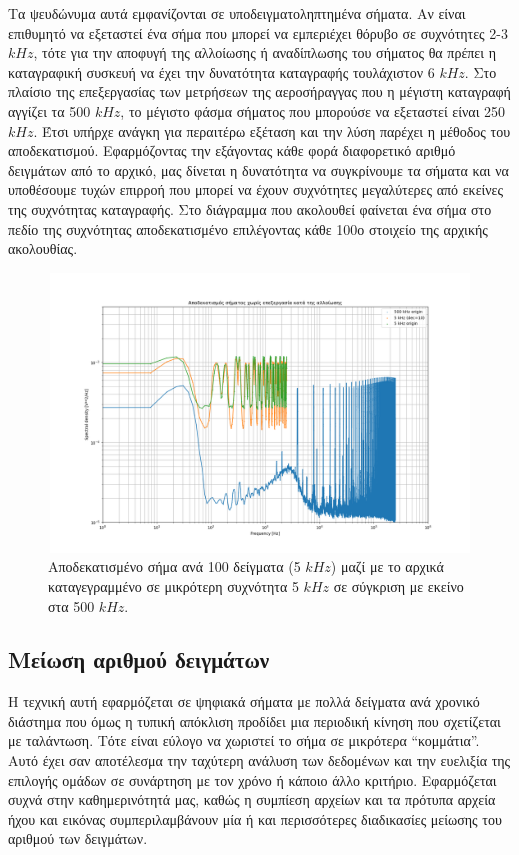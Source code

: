 \documentclass[breaklines=true, 12pt]{article}
\begin{document}
Τα ψευδώνυμα αυτά εμφανίζονται σε υποδειγματοληπτημένα σήματα. Αν είναι επιθυμητό
να εξεταστεί ένα σήμα που μπορεί να εμπεριέχει θόρυβο σε συχνότητες 2-3 \(kHz\), τότε για
την αποφυγή της αλλοίωσης ή αναδίπλωσης του σήματος θα πρέπει η καταγραφική συσκευή
να έχει την δυνατότητα καταγραφής τουλάχιστον 6 \(kHz\). Στο πλαίσιο της επεξεργασίας των
μετρήσεων της αεροσήραγγας που η μέγιστη καταγραφή αγγίζει τα 500 \(kHz\), το μέγιστο
φάσμα σήματος που μπορούσε να εξεταστεί είναι 250 \(kHz\). Έτσι υπήρχε ανάγκη για
περαιτέρω εξέταση και την λύση παρέχει η μέθοδος του αποδεκατισμού. Εφαρμόζοντας την
εξάγοντας κάθε φορά διαφορετικό αριθμό δειγμάτων από το αρχικό, μας δίνεται η
δυνατότητα να συγκρίνουμε τα σήματα και να υποθέσουμε τυχών επιρροή που μπορεί να
έχουν συχνότητες μεγαλύτερες από εκείνες της συχνότητας καταγραφής. Στο διάγραμμα
που ακολουθεί φαίνεται ένα σήμα στο πεδίο της συχνότητας αποδεκατισμένο επιλέγοντας
κάθε 100ο στοιχείο της αρχικής ακολουθίας.

\begin{figure}[htbp]
\centering
\includegraphics[width=500px,height=280px]{./decimation/with_aliasing.png}
\caption{Αποδεκατισμένο σήμα ανά 100 δείγματα (5 \(kHz\)) μαζί με το αρχικά καταγεγραμμένο σε μικρότερη συχνότητα 5 \(kHz\) σε σύγκριση με εκείνο στα 500 \(kHz\).}
\end{figure}
\subsection{Μείωση αριθμού δειγμάτων}
\label{sec:orgd8b657c}
Η τεχνική αυτή εφαρμόζεται σε ψηφιακά σήματα με πολλά δείγματα ανά
χρονικό διάστημα που όμως η τυπική απόκλιση προδίδει μια περιοδική
κίνηση που σχετίζεται με ταλάντωση. Τότε είναι εύλογο να χωριστεί το
σήμα σε μικρότερα “κομμάτια”. Αυτό έχει σαν αποτέλεσμα την ταχύτερη
ανάλυση των δεδομένων και την ευελιξία της επιλογής ομάδων σε συνάρτηση
με τον χρόνο ή κάποιο άλλο κριτήριο. Εφαρμόζεται συχνά στην
καθημερινότητά μας, καθώς η συμπίεση αρχείων και τα πρότυπα αρχεία ήχου
και εικόνας συμπεριλαμβάνουν μία ή και περισσότερες διαδικασίες μείωσης
του αριθμού των δειγμάτων.
\end{document}
